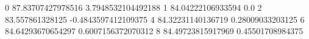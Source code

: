 0 87.83707427978516 3.7948532104492188
1 84.04222106933594 0.0
2 83.557861328125 -0.4843597412109375
4 84.32231140136719 0.28009033203125
6 84.64293670654297 0.6007156372070312
8 84.49723815917969 0.45501708984375
